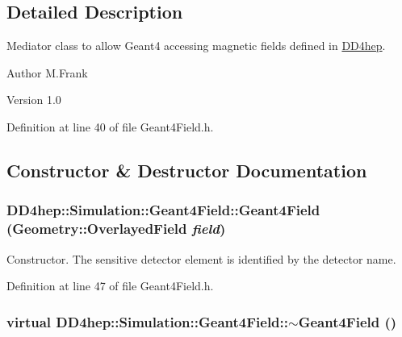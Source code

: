 \subsection{Detailed Description}
Mediator class to allow Geant4 accessing magnetic fields defined in \hyperlink{namespace_d_d4hep}{DD4hep}. \begin{DoxyAuthor}{Author}
M.Frank 
\end{DoxyAuthor}
\begin{DoxyVersion}{Version}
1.0 
\end{DoxyVersion}


Definition at line 40 of file Geant4Field.h.

\subsection{Constructor \& Destructor Documentation}
\hypertarget{class_d_d4hep_1_1_simulation_1_1_geant4_field_addb058e48762664448c2c1fdce1cc807}{
\subsubsection[{Geant4Field}]{\setlength{\rightskip}{0pt plus 5cm}DD4hep::Simulation::Geant4Field::Geant4Field ({\bf Geometry::OverlayedField} {\em field})}}
\label{class_d_d4hep_1_1_simulation_1_1_geant4_field_addb058e48762664448c2c1fdce1cc807}


Constructor. The sensitive detector element is identified by the detector name. 

Definition at line 47 of file Geant4Field.h.\hypertarget{class_d_d4hep_1_1_simulation_1_1_geant4_field_ac653a1246053747ac97c18dee3c8d9c2}{
\subsubsection[{$\sim$Geant4Field}]{\setlength{\rightskip}{0pt plus 5cm}virtual DD4hep::Simulation::Geant4Field::$\sim$Geant4Field ()}}
\label{class_d_d4hep_1_1_simulation_1_1_geant4_field_ac653a1246053747ac97c18dee3c8d9c2}


